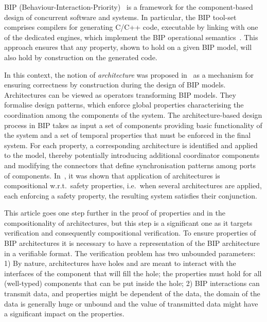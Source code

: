 \documentclass{llncs}
\newcommand{\ie}[1][\ ]{i.e.#1}
\newcommand{\eg}[1][\ ]{e.g.#1}
\newcommand{\wrt}[1][\ ]{w.r.t.#1}
\begin{document}
BIP (Behaviour-Interaction-Priority)~\cite{bip} is a framework for the
component-based design of concurrent software and systems.  In
particular, the BIP tool-set comprises compilers for generating C/C++
code, executable by linking with one of the dedicated engines, which
implement the BIP operational semantics~\cite{BliSif08-acp-tc}.
This approach ensures that any property, shown to hold on a given BIP
model, will also hold by construction on the generated code.

In this context, the notion of \emph{architecture} was proposed
in~\cite{AttieBBJS16-architectures-faoc} as a mechanism for ensuring
correctness by construction during the design of BIP models.
Architectures can be viewed as operators transforming BIP models.
They formalise design patterns, which enforce global properties
characterising the coordination among the components of the system.
The architecture-based design process in BIP takes as input a set of
components providing basic functionality of the system and a set of
temporal properties that must be enforced in the final system.  For
each property, a corresponding architecture is identified
and applied to the model, thereby potentially introducing additional
coordinator components and modifying the connectors that define
synchronisation patterns among ports of components.
In~\cite{AttieBBJS16-architectures-faoc}, it was shown that
application of architectures is compositional \wrt safety properties,
\ie when several architectures are applied, each enforcing a safety
property, the resulting system satisfies their conjunction.

This article goes one step further in the proof of properties and in the compositionality of architectures, but this step is a significant one as it targets verification and consequently compositional verification. To ensure properties of BIP architectures
it is necessary to have a representation of the BIP architecture in a verifiable format. 
The verification problem has two unbounded parameters: 1) By nature, architectures have holes and are meant to interact with the interfaces of the component that will fill the hole; the properties must hold for all (well-typed) components that can be put inside the hole; 2) BIP interactions can transmit data, and properties might be dependent of the data, the domain of the data is generally huge or unbound and the value of transmitted data might have a significant impact on the properties.
\end{document}
